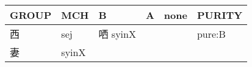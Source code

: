\documentclass[14pt,a4paper]{scrartcl}
\begin{document}
\begin{longtable}[c]{@{}llllll@{}}
\toprule
\begin{minipage}[b]{0.14\columnwidth}\raggedright\strut
GROUP
\strut\end{minipage} &
\begin{minipage}[b]{0.14\columnwidth}\raggedright\strut
MCH
\strut\end{minipage} &
\begin{minipage}[b]{0.14\columnwidth}\raggedright\strut
B
\strut\end{minipage} &
\begin{minipage}[b]{0.14\columnwidth}\raggedright\strut
A
\strut\end{minipage} &
\begin{minipage}[b]{0.14\columnwidth}\raggedright\strut
none
\strut\end{minipage} &
\begin{minipage}[b]{0.14\columnwidth}\raggedright\strut
PURITY
\strut\end{minipage}\tabularnewline
\midrule
\endhead
\begin{minipage}[t]{0.14\columnwidth}\raggedright\strut
西
\strut\end{minipage} &
\begin{minipage}[t]{0.14\columnwidth}\raggedright\strut
sej
\strut\end{minipage} &
\begin{minipage}[t]{0.14\columnwidth}\raggedright\strut
哂 syinX
\strut\end{minipage} &
\begin{minipage}[t]{0.14\columnwidth}\raggedright\strut
\strut\end{minipage} &
\begin{minipage}[t]{0.14\columnwidth}\raggedright\strut
\strut\end{minipage} &
\begin{minipage}[t]{0.14\columnwidth}\raggedright\strut
pure:B
\strut\end{minipage}\tabularnewline
\begin{minipage}[t]{0.14\columnwidth}\raggedright\strut
妻
\strut\end{minipage} &
\begin{minipage}[t]{0.14\columnwidth}\raggedright\strut
syinX
\strut\end{minipage} &
\begin{minipage}[t]{0.14\columnwidth}\raggedright\strut
\strut\end{minipage} &
\begin{minipage}[t]{0.14\columnwidth}\raggedright\strut

\end{minipage}
\end{longtable}
\end{document}
